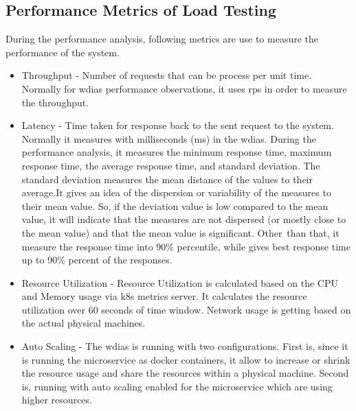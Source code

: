 \subsection{Performance Metrics of Load Testing}
\label{subse:test_plan_metrics}
During the performance analysis, following metrics are use to measure the performance of the system.
\begin{itemize}
    \item Throughput - Number of requests that can be process per unit time. Normally for \acrshort{wdias} performance observations, it uses \acrfull{rps} in order to measure the throughput.
    \item Latency - Time taken for response back to the sent request to the system. Normally it measures with milliseconds (ms) in the \acrshort{wdias}. During the performance analysis, it measures the minimum response time, maximum response time, the average response time, and standard deviation. The standard deviation measures the mean distance of the values to their average.It gives an idea of the dispersion or variability of the measures to their mean value. So, if the deviation value is low compared to the mean value, it will indicate that the measures are not dispersed (or mostly close to the mean value) and that the mean value is significant. Other than that, it measure the response time into 90\% percentile, while gives best response time up to 90\% percent of the responses.
    \item Resource Utilization - Resource Utilization is calculated based on the CPU and Memory usage via \acrshort{k8s} metrics server. It calculates the resource utilization over 60 seconds of time window. Network usage is getting based on the actual physical machines.
    \item Auto Scaling - The \acrshort{wdias} is running with two configurations. First is, since it is running the microservice as docker containers, it allow to increase or shrink the resource usage and share the resources within a physical machine. Second is, running with auto scaling enabled for the microservice which are using higher resources.
\end{itemize}
